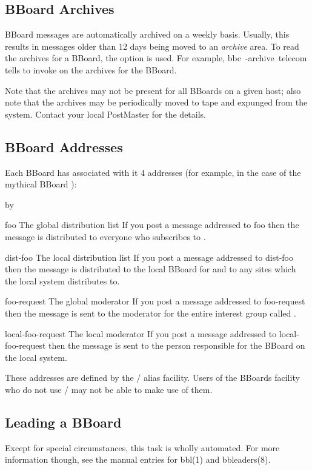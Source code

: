 \subsection{BBoard Archives}
BBoard messages are automatically archived on a weekly basis.
Usually, this results in messages older than 12 days being moved to an
{\it archive} area.
To read the archives for a BBoard, the  option is used.
For example, \example bbc\ -archive\ telecom\endexample
tells  to invoke  on the archives for the 
BBoard.

Note that the archives may not be present for all BBoards on a given host;
also note that the archives may be periodically moved to tape and expunged
from the system.
Contact your local PostMaster for the details.

\subsection{BBoard Addresses}
Each BBoard has associated with it 4 addresses
(for example, in the case of the mythical BBoard ):
\smallskip
{\advance\leftskip by\parindent
\item{\tx foo} The global distribution list\hbreak
If you post a message addressed to {\tx foo} then the message is distributed
to everyone who subscribes to .

\item{\tx dist-foo} The local distribution list\hbreak
If you post a message addressed to {\tx dist-foo} then the message is
distributed to the local BBoard for 
and to any sites which the local system distributes to.

\item{\tx foo-request} The global moderator\hbreak
If you post a message addressed to {\tx foo-request} then the message is
sent to the moderator for the entire interest group called .

\item{\tx local-foo-request} The local moderator\hbreak
If you post a message addressed to {\tx local-foo-request} then the message is
sent to the person responsible for the BBoard  on the local system.
\medskip}
\noindent
These addresses are defined by the \MH/ alias facility.
Users of the BBoards facility who do not use \MH/ may not be able to make use
of them.

\subsection{Leading a BBoard}
Except for special circumstances, this task is wholly automated.
For more information though,
see the manual entries for \man bbl(1) and \man bbleaders(8).

